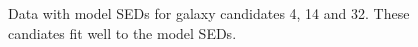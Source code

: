 \documentclass[times,usenatbib]{mn2e}
\begin{document}
\begin{figure}
\begin{center}
\caption{Data with model SEDs for galaxy candidates 4, 14 and 32. These candiates fit well to the model SEDs.}
\label{goodfits}
\end{center}
\end{figure} 
\end{document}
